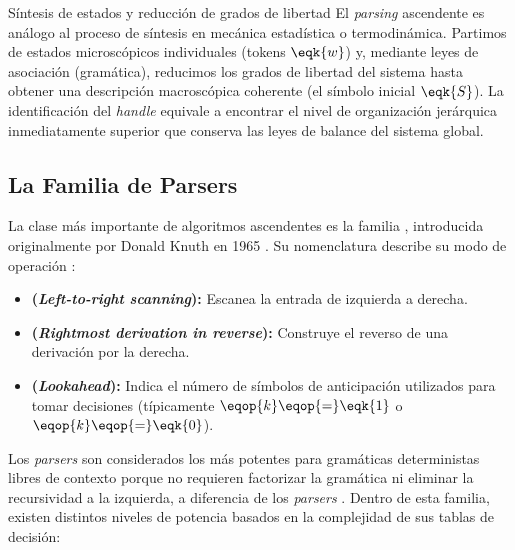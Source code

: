\begin{fisicaconexion}{Síntesis de estados y reducción de grados de libertad}
El \textit{parsing} ascendente es análogo al proceso de síntesis en mecánica estadística o termodinámica. Partimos de estados microscópicos individuales (tokens $\eqk{w}$) y, mediante leyes de asociación (gramática), reducimos los grados de libertad del sistema hasta obtener una descripción macroscópica coherente (el símbolo inicial $\eqk{S}$). La identificación del \textit{handle} equivale a encontrar el nivel de organización jerárquica inmediatamente superior que conserva las leyes de balance del sistema global.
\end{fisicaconexion}

\subsection{La Familia de Parsers }
\label{subsec:3_6_2_familia_lr}

La clase más importante de algoritmos ascendentes es la familia , introducida originalmente por Donald Knuth en 1965 \cite{aho2006compilers}. Su nomenclatura describe su modo de operación \cite{aho2006compilers}:

\begin{itemize}
    \item \textbf{ (\textit{Left-to-right scanning}):} Escanea la entrada de izquierda a derecha.
    \item \textbf{ (\textit{Rightmost derivation in reverse}):} Construye el reverso de una derivación por la derecha.
    \item \textbf{ (\textit{Lookahead}):} Indica el número de símbolos de anticipación utilizados para tomar decisiones (típicamente $\eqop{k} \eqop{=} \eqk{1}$ o $\eqop{k} \eqop{=} \eqk{0}$).
\end{itemize}

Los \textit{parsers}  son considerados los más potentes para gramáticas deterministas libres de contexto porque no requieren factorizar la gramática ni eliminar la recursividad a la izquierda, a diferencia de los \textit{parsers}  \cite{aho2006compilers}. Dentro de esta familia, existen distintos niveles de potencia basados en la complejidad de sus tablas de decisión:

